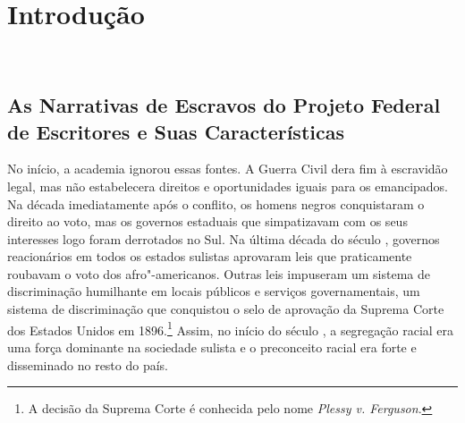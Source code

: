 \chapter*{Introdução}

\begin{flushright}
\\\vspace{-3pt}
\end{flushright}




\section{As Narrativas de Escravos do Projeto Federal de Escritores e Suas
Características}



No início, a academia ignorou essas fontes. A Guerra Civil dera fim à
escravidão legal, mas não estabelecera direitos e oportunidades iguais
para os emancipados. Na década imediatamente após o conflito, os homens
negros conquistaram o direito ao voto, mas os governos estaduais que
simpatizavam com os seus interesses logo foram derrotados no Sul. Na
última década do século , governos reacionários em todos os estados
sulistas aprovaram leis que praticamente roubavam o voto dos
afro"-americanos. Outras leis impuseram um sistema de discriminação
humilhante em locais públicos e serviços governamentais, um sistema de
discriminação que conquistou o selo de aprovação da Suprema Corte dos
Estados Unidos em 1896.\footnote{A decisão da Suprema Corte é conhecida
  pelo nome \emph{Plessy v. Ferguson}.} Assim, no início do século , a
segregação racial era uma força dominante na sociedade sulista e o
preconceito racial era forte e disseminado no resto do país.


